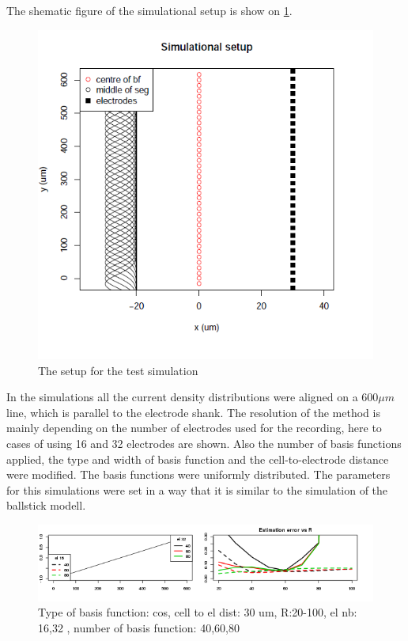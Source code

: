 \documentclass[12pt,a4paper]{article}
\begin{document}
The shematic figure of the simulational setup is show on \ref{fig: test_setup}.


\begin{figure}[h]
\centering
\includegraphics[width= 10 cm]{plots/setup_test.png}
\caption{The setup for the test simulation}
\label{fig: test_setup}
\end{figure}
In the simulations all the current density distributions were aligned on a $600 \mu m$line, which is parallel to the electrode shank. The resolution of the method is mainly depending on the number of electrodes used for the recording, here to cases of using 16 and 32 electrodes are shown. Also the number of basis functions applied, the type and width of basis function and the cell-to-electrode distance were modified. The basis functions were uniformly distributed. The parameters for this simulations were set in a way that it is similar to the simulation of the ballstick modell.


\begin{figure}[h]
\includegraphics[width=15cm]{plots/error_Rtest_cos_patt1_el_both.png}
\caption{Type of basis function: cos, cell to el dist: 30 um, R:20-100, el nb: 16,32 , number of basis function: 40,60,80}
\label{fig:error_cos0}
\end{figure}
\end{document}
